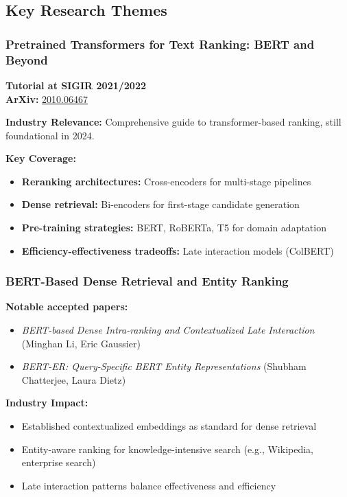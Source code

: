 \documentclass[11pt,letterpaper]{article}
\begin{document}
\subsection{Key Research Themes}

\subsubsection{Pretrained Transformers for Text Ranking: BERT and Beyond}
\textbf{Tutorial at SIGIR 2021/2022}\\
\textbf{ArXiv:} \href{https://arxiv.org/abs/2010.06467}{2010.06467}

\textbf{Industry Relevance:} Comprehensive guide to transformer-based ranking, still foundational in 2024.

\textbf{Key Coverage:}
\begin{itemize}[leftmargin=*]
    \item \textbf{Reranking architectures:} Cross-encoders for multi-stage pipelines
    \item \textbf{Dense retrieval:} Bi-encoders for first-stage candidate generation
    \item \textbf{Pre-training strategies:} BERT, RoBERTa, T5 for domain adaptation
    \item \textbf{Efficiency-effectiveness tradeoffs:} Late interaction models (ColBERT)
\end{itemize}

\subsubsection{BERT-Based Dense Retrieval and Entity Ranking}
\textbf{Notable accepted papers:}
\begin{itemize}[leftmargin=*]
    \item \textit{BERT-based Dense Intra-ranking and Contextualized Late Interaction} (Minghan Li, Eric Gaussier)
    \item \textit{BERT-ER: Query-Specific BERT Entity Representations} (Shubham Chatterjee, Laura Dietz)
\end{itemize}

\textbf{Industry Impact:}
\begin{itemize}[leftmargin=*]
    \item Established contextualized embeddings as standard for dense retrieval
    \item Entity-aware ranking for knowledge-intensive search (e.g., Wikipedia, enterprise search)
    \item Late interaction patterns balance effectiveness and efficiency
\end{itemize}
\end{document}
